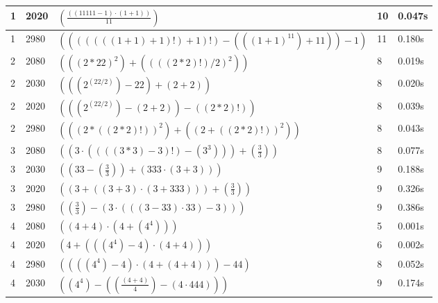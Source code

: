 \documentclass{article}
\theoremstyle{nonumberplain}
\begin{document}
\begin{center}
\begin{longtable}{ | l | l | p{9.5cm} | l | l | }
        1 & 2020 & \( \left(\frac{\left(\left(11111 - 1\right) \cdot \left(1 + 1\right)\right)}{11}\right) \) & 10 & 0.047s \\\hline
        1 & 2980 & \( \left(\left(\left(((((1 + 1) + 1)!) + 1)!\right) - \left(\left({(1 + 1)}^{11}\right) + 11\right)\right) - 1\right) \) & 11 & 0.180s \\\hline
        2 & 2080 & \( \left(\left({(2 * 22)}^{2}\right) + \left({(((2 * 2)!) / 2)}^{2}\right)\right) \) & 8 & 0.019s \\\hline
        2 & 2030 & \( \left(\left(\left({2}^{(22 / 2)}\right) - 22\right) + \left(2 + 2\right)\right) \) & 8 & 0.020s \\\hline
        2 & 2020 & \( \left(\left(\left({2}^{(22 / 2)}\right) - \left(2 + 2\right)\right) - \left((2 * 2)!\right)\right) \) & 8 & 0.039s \\\hline
        2 & 2980 & \( \left(\left({(2 * ((2 * 2)!))}^{2}\right) + \left({(2 + ((2 * 2)!))}^{2}\right)\right) \) & 8 & 0.043s \\\hline
        3 & 2080 & \( \left(\left(3 \cdot \left(\left(((3 * 3) - 3)!\right) - \left({3}^{3}\right)\right)\right) + \left(\frac{3}{3}\right)\right) \) & 8 & 0.077s \\\hline
        3 & 2030 & \( \left(\left(33 - \left(\frac{3}{3}\right)\right) + \left(333 \cdot \left(3 + 3\right)\right)\right) \) & 9 & 0.188s \\\hline
        3 & 2020 & \( \left(\left(3 + \left(\left(3 + 3\right) \cdot \left(3 + 333\right)\right)\right) + \left(\frac{3}{3}\right)\right) \) & 9 & 0.326s \\\hline
        3 & 2980 & \( \left(\left(\frac{3}{3}\right) - \left(3 \cdot \left(\left(\left(3 - 33\right) \cdot 33\right) - 3\right)\right)\right) \) & 9 & 0.386s \\\hline
        4 & 2080 & \( \left(\left(4 + 4\right) \cdot \left(4 + \left({4}^{4}\right)\right)\right) \) & 5 & 0.001s \\\hline
        4 & 2020 & \( \left(4 + \left(\left(\left({4}^{4}\right) - 4\right) \cdot \left(4 + 4\right)\right)\right) \) & 6 & 0.002s \\\hline
        4 & 2980 & \( \left(\left(\left(\left({4}^{4}\right) - 4\right) \cdot \left(4 + \left(4 + 4\right)\right)\right) - 44\right) \) & 8 & 0.052s \\\hline
        4 & 2030 & \( \left(\left({4}^{4}\right) - \left(\left(\frac{\left(4 + 4\right)}{4}\right) - \left(4 \cdot 444\right)\right)\right) \) & 9 & 0.174s \\\hline

\end{longtable}
\end{center}
\end{document}
